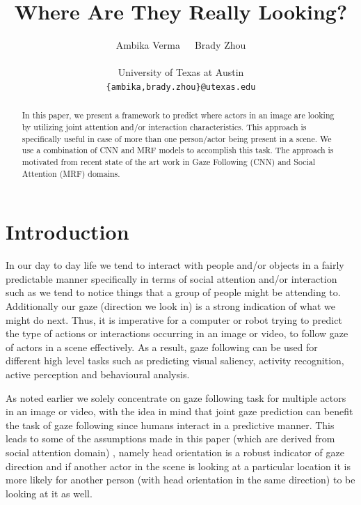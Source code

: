 \documentclass[10pt,twocolumn,letterpaper]{article}
\begin{document}
\title{Where Are They Really Looking?}

\author{
Ambika Verma\ \ \ Brady Zhou\\ \\
{\fontsize{11}{13}\selectfont University of Texas at Austin}\\
{\fontsize{10}{11}\selectfont \texttt{\{ambika,brady.zhou\}@utexas.edu}}
}

\maketitle

\begin{abstract}
    In this paper, we present a framework to predict where actors in an image are looking by utilizing joint attention and/or interaction characteristics. This approach is specifically useful in case of more than one person/actor being present in a scene. We use a combination of CNN \cite{nips15_recasens} and MRF \cite{fathi2012social} models to accomplish this task. The approach is motivated from recent state of the art work in Gaze Following (CNN) and Social Attention (MRF) domains.
\end{abstract}

\section{Introduction}

In our day to day life we tend to interact with people and/or objects in a fairly predictable manner specifically in terms of social attention and/or interaction such as we tend to notice things that a group of people might be attending to. Additionally our gaze (direction we look in) is a strong indication of what we might do next. Thus, it is imperative for a computer or robot trying to predict the type of actions or interactions occurring in an image or video, to follow gaze of actors in a scene effectively. As a result, gaze following can be used for different high level tasks such as predicting visual saliency, activity recognition, active perception and behavioural analysis.

As noted earlier we solely concentrate on gaze following task for multiple actors in an image or video, with the idea in mind that joint gaze prediction can benefit the task of gaze following since humans interact in a predictive manner. This leads to some of the assumptions made in this paper (which are derived from social attention domain) \cite{fathi2012social}, namely head orientation is a robust indicator of gaze direction and if another actor in the scene is looking at a particular location it is more likely for another person (with head orientation in the same direction) to be looking at it as well.
\end{document}
